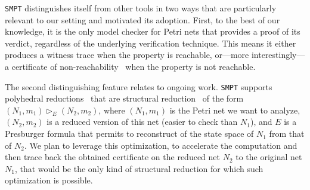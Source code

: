 \texttt{SMPT} distinguishes itself from other tools in two ways that are particularly relevant to our setting and motivated its adoption. First, to the best of our knowledge, it is the only model checker for Petri nets that provides a proof of its verdict, regardless of the underlying verification technique. This means it either produces a witness trace when the property is reachable, or—more interestingly—a certificate of non-reachability~\cite{AmDaHu22} when the property is not reachable.

The second distinguishing feature relates to ongoing work. \texttt{SMPT} supports polyhedral reductions~\cite{AmBeDa21} that are structural reduction~\cite{berthelot_transformations_1987,berthomieu_counting_2019} of the form $(N_1, m_1) \vartriangleright_E (N_2, m_2)$, where $(N_1, m_1)$ is the Petri net we want to analyze, $(N_2, m_2)$ is a reduced version of this net (easier to check than $N_1$), and $E$ is a Presburger formula that permits to reconstruct of the state space of $N_1$ from that of $N_2$. We plan to leverage this optimization, to accelerate the computation and then trace back the obtained certificate on the reduced net $N_2$ to the original net $N_1$, that would be the only kind of structural reduction for which such optimization is possible.

%
%

